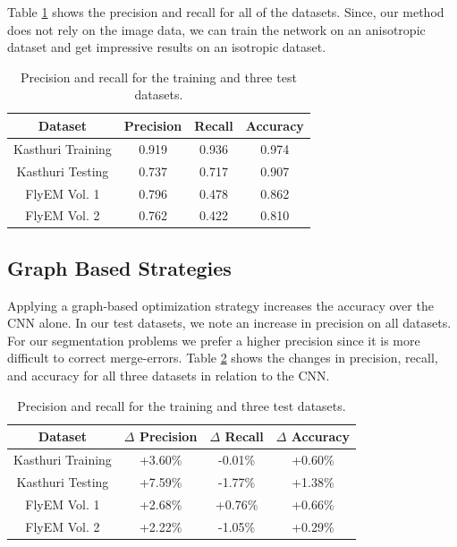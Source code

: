 Table \ref{table:classification} shows the precision and recall for all of the datasets. 
Since, our method does not rely on the image data, we can train the network on an anisotropic dataset and get impressive results on an isotropic dataset. 

\begin{table}[h]
	\centering
	\begin{tabular}{c c c c} \hline
		\textbf{Dataset} & \textbf{Precision} & \textbf{Recall} & \textbf{Accuracy} \\ \hline
		Kasthuri Training & 0.919 & 0.936 & 0.974 \\
		Kasthuri Testing & 0.737 & 0.717 & 0.907 \\
		FlyEM Vol. 1 & 0.796 & 0.478 & 0.862 \\ 
		FlyEM Vol. 2 & 0.762 & 0.422 & 0.810 \\ \hline
	\end{tabular}
	\caption{Precision and recall for the training and three test datasets.}
	\label{table:classification}
\end{table}

\subsection{Graph Based Strategies}

Applying a graph-based optimization strategy increases the accuracy over the CNN alone. 
In our test datasets, we note an increase in precision on all datasets. 
For our segmentation problems we prefer a higher precision since it is more difficult to correct merge-errors. 
Table \ref{table:multicut} shows the changes in precision, recall, and accuracy for all three datasets in relation to the CNN.

\begin{table}[h]
	\centering
	\begin{tabular}{c c c c} \hline
		\textbf{Dataset} & $\Delta$ \textbf{Precision} & $\Delta$ \textbf{Recall} & $\Delta$ \textbf{Accuracy} \\ \hline
		Kasthuri Training & +3.60\% & -0.01\% & +0.60\% \\
		Kasthuri Testing & +7.59\% & -1.77\% & +1.38\% \\
		FlyEM Vol. 1 & +2.68\% & +0.76\% & +0.66\% \\ 
		FlyEM Vol. 2 & +2.22\% & -1.05\% & +0.29\% \\ \hline
	\end{tabular}
	\caption{Precision and recall for the training and three test datasets.}
	\label{table:multicut}
\end{table}


